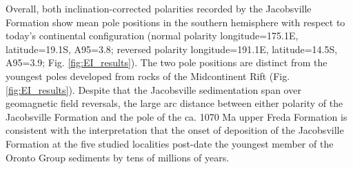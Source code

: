 \documentclass[draft]{agujournal2019}
\begin{document}
Overall, both inclination-corrected polarities recorded by the Jacobsville Formation show mean pole positions in the southern hemisphere with respect to today's continental configuration (normal polarity longitude=175.1\textdegree E, latitude=19.1\textdegree S, A95=3.8\textdegree; reversed polarity longitude=191.1\textdegree E, latitude=14.5\textdegree S, A95=3.9\textdegree; Fig. \ref{fig:EI_results}). The two pole positions are distinct from the youngest poles developed from rocks of the Midcontinent Rift (Fig. \ref{fig:EI_results}). Despite that the Jacobsville sedimentation span over geomagnetic field reversals, the large arc distance between either polarity of the Jacobsville Formation and the pole of the ca. 1070 Ma upper Freda Formation \cite{Henry1977a} is consistent with the interpretation that the onset of deposition of the Jacobsville Formation at the five studied localities post-date the youngest member of the Oronto Group sediments by tens of millions of years. 

\end{document}

